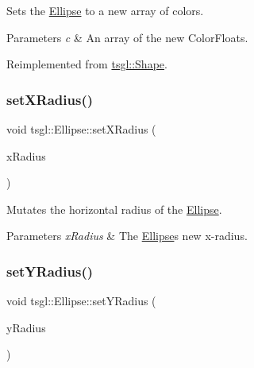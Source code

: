 Sets the \hyperlink{classtsgl_1_1_ellipse}{Ellipse} to a new array of colors. 


\begin{DoxyParams}{Parameters}
{\em c} & An array of the new Color\+Floats. \\
\hline
\end{DoxyParams}


Reimplemented from \hyperlink{classtsgl_1_1_shape_ad7e554b5d4cea111ec518548b9f21388}{tsgl\+::\+Shape}.

\mbox{\label{classtsgl_1_1_ellipse_a0bbb654f584ad6bb7a89c8fb6e1ecaf1}} 
\subsubsection{\texorpdfstring{set\+X\+Radius()}{setXRadius()}}
{\footnotesize\ttfamily void tsgl\+::\+Ellipse\+::set\+X\+Radius (\begin{DoxyParamCaption}\item[{G\+Lfloat}]{x\+Radius }\end{DoxyParamCaption})}



Mutates the horizontal radius of the \hyperlink{classtsgl_1_1_ellipse}{Ellipse}. 


\begin{DoxyParams}{Parameters}
{\em x\+Radius} & The \hyperlink{classtsgl_1_1_ellipse}{Ellipse}\textquotesingle{}s new x-\/radius. \\
\hline
\end{DoxyParams}
\mbox{\label{classtsgl_1_1_ellipse_aca11daaf59dd05b15943597a5f0adfd6}} 
\subsubsection{\texorpdfstring{set\+Y\+Radius()}{setYRadius()}}
{\footnotesize\ttfamily void tsgl\+::\+Ellipse\+::set\+Y\+Radius (\begin{DoxyParamCaption}\item[{G\+Lfloat}]{y\+Radius }\end{DoxyParamCaption})}



